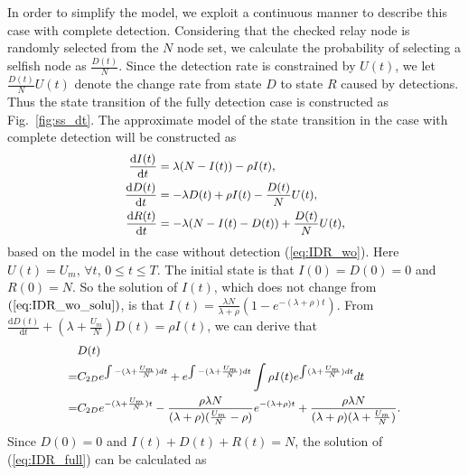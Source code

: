 In order to simplify the model,
we exploit a continuous manner to
describe this case with complete detection.
Considering that the checked relay node
is randomly selected from the $N$ node set,
we calculate the probability of selecting a selfish node
as $\frac{D(t)}{N}$.
Since the detection rate is constrained by $U(t)$,
we let $\frac{D(t)}{N}U(t)$ denote
the change rate from state $D$ to state $R$ caused by detections.
Thus the state transition of the fully detection case
is constructed as Fig.~\ref{fig:ss_dt}.
The approximate model of the state transition in the case with complete detection
will be constructed as
\begin{equation}
\begin{small}
\label{eq:IDR_full}
\begin{aligned}
\frac{\mathrm{d} I(t)}{\mathrm{d} t} &=  \lambda (N-I(t)) - \rho I(t),\\
\frac{\mathrm{d} D(t)}{\mathrm{d} t} &= - \lambda D(t) + \rho I(t) - \frac{D(t)}{N} U(t),\\
\frac{\mathrm{d} R(t)}{\mathrm{d} t} &= - \lambda (N-I(t)-D(t)) + \frac{D(t)}{N} U(t),
\end{aligned}
\end{small}
\end{equation}
based on the model in the case without detection (\ref{eq:IDR_wo}).
Here $U(t) = U_{m}$, $\forall t$, $0 \le t \le T$.
The initial state is that $I(0)=D(0)=0$ and $R(0)=N$.
So the solution of $I(t)$, which does not change from $(\ref{eq:IDR_wo_solu})$,
is that $I(t) = \frac{ \lambda N }{ \lambda + \rho }(1- e^{-(\lambda + \rho)t})$.
From $\frac{\mathrm{d} D(t)}{\mathrm{d} t} + (\lambda + \frac{U_{m}}{N}) D(t)= \rho I(t)$,
we can derive that
\begin{equation}
\begin{small}
\nonumber
\begin{aligned}
& D(t) \\
=& C_{2D} e^{\int -(\lambda + \frac{U_{m}}{N}) dt}
+ e^{\int -(\lambda + \frac{U_{m}}{N}) dt}
\int \rho I(t) e^{\int (\lambda + \frac{U_{m}}{N}) dt} dt \\
=& C_{2D} e^{-(\lambda + \frac{U_{m}}{N})t}
- \frac{ \rho \lambda N }
{ (\lambda + \rho)(\frac{U_{m}}{N} - \rho) } e^{-(\lambda + \rho)t}
+ \frac{ \rho \lambda N }
{ (\lambda + \rho)(\lambda + \frac{U_{m}}{N}) }.
\end{aligned}
\end{small}
\end{equation}
Since $D(0) = 0$ and $I(t) + D(t) + R(t) = N$,
the solution of (\ref{eq:IDR_full}) can be calculated as
